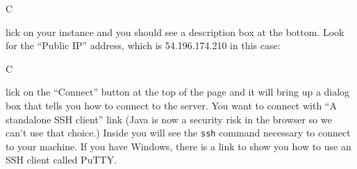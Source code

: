 \documentclass[titlepage]{tufte-book}
\newcounter{problem}
\newcommand{\step}[1]{{}
\vspace{4pt} \noindent {\bf \theproblem. }#1\addtocounter{problem}{1}}
\begin{document}
\begin{fullwidth}
\step Click on your instance and you should see a description box at the bottom. Look for the ``Public IP'' address, which is 54.196.174.210 in this case:


\step Click on the ``Connect'' button at the top of the page and it will bring up a dialog box that tells you how to connect to the server.  You want to connect with ``A standalone SSH client'' link (Java is now a security risk in the browser so we can't use that choice.)  Inside you will see the {\tt ssh} command necessary to connect to your machine. If you have Windows, there is a link to show you how to use an SSH client called PuTTY. 



\end{fullwidth}
\end{document}
